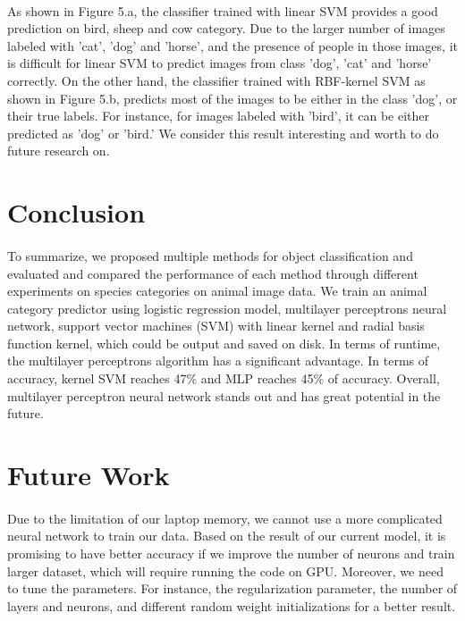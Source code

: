 \documentclass{article}
\begin{document}
\paragraph{}
As shown in Figure 5.a, the classifier trained with linear SVM provides a good prediction on bird, sheep and cow category. Due to the larger number of images labeled with 'cat', 'dog' and 'horse', and the presence of people in those images, it is difficult for linear SVM to predict images from class 'dog', 'cat' and 'horse' correctly. On the other hand, the classifier trained with RBF-kernel SVM as shown in Figure 5.b, predicts most of the images to be either in the class 'dog', or their true labels. For instance, for images labeled with 'bird', it can be either predicted as 'dog' or 'bird.' We consider this result interesting and worth to do future research on.

 

\section{Conclusion}
\paragraph{}
To summarize, we proposed multiple methods for object classification and evaluated and compared the performance of each method through different experiments on species categories on animal image data. We train an animal category predictor using logistic regression model, multilayer perceptrons neural network, support vector machines (SVM) with linear kernel and radial basis function kernel, which could be output and saved on disk. In terms of runtime, the multilayer perceptrons algorithm has a significant advantage. In terms of accuracy, kernel SVM reaches 47$\%$ and MLP reaches 45$\%$ of accuracy. Overall, multilayer perceptron neural network stands out and has great potential in the future.
 

\section{Future Work}
\paragraph{} 
Due to the limitation of our laptop memory, we cannot use a more complicated neural network to train our data. Based on the result of our current model, it is promising to have better accuracy if we improve the number of neurons and train larger dataset, which will require running the code on GPU. Moreover, we need to tune the parameters. For instance, the regularization parameter, the number of layers and neurons, and different random weight initializations for a better result. 
\end{document}

